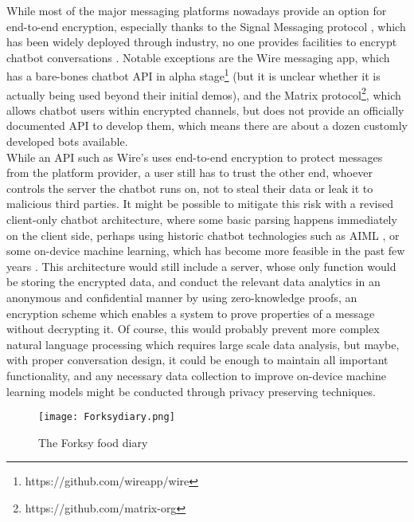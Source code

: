 While most of the major messaging platforms nowadays provide an option for end-to-end encryption, especially thanks to the Signal Messaging protocol \cite{signal}, which has been widely deployed through industry, no one provides facilities to encrypt chatbot conversations \cite{Alesanco2018}. Notable exceptions are the Wire messaging app, which has a bare-bones chatbot API in alpha stage\footnote{https://github.com/wireapp/wire} (but it is unclear whether it is actually being used beyond their initial demos), and the Matrix protocol\footnote{https://github.com/matrix-org}, which allows chatbot users within encrypted channels, but does not provide an officially documented API to develop them, which means there are about a dozen customly developed bots available. \\
While an API such as Wire's uses end-to-end encryption to protect messages from the platform provider, a user still has to trust the other end, whoever controls the server the chatbot runs on, not to steal their data or leak it to malicious third parties. It might be possible to mitigate this risk with a revised client-only chatbot architecture, where some basic parsing happens immediately on the client side, perhaps using historic chatbot technologies such as AIML \cite{aiml}, or some on-device machine learning, which has become more feasible in the past few years \cite{tensorflow}. This architecture would still include a server, whose only function would be storing the encrypted data, and conduct the relevant data analytics in an anonymous and confidential manner by using zero-knowledge proofs, an encryption scheme which enables a system to prove properties of a message without decrypting it. Of course, this would probably prevent more complex natural language processing which requires large scale data analysis, but maybe, with proper conversation design, it could be enough to maintain all important functionality, and any necessary data collection to improve on-device machine learning models might be conducted through privacy preserving techniques.
\begin{figure}[h!]
  \centering
  \texttt{[image: Forksydiary.png]}
  \caption{The Forksy food diary}
\end{figure} 
